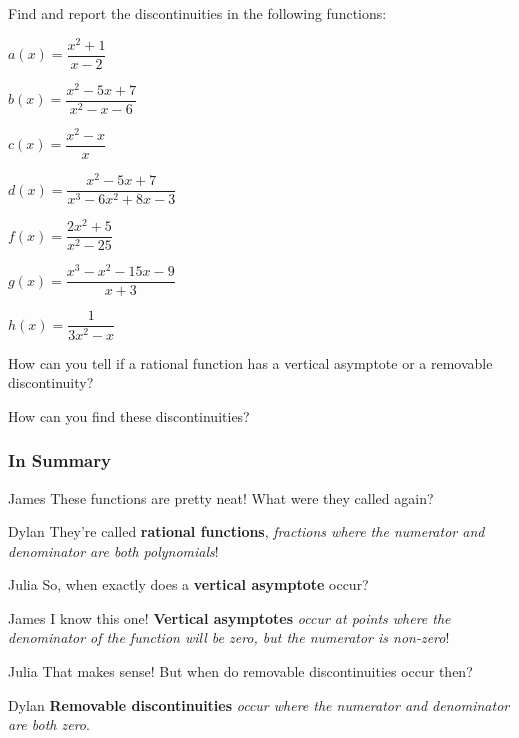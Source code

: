 \documentclass{ximera}
\begin{document}
Find and report the discontinuities in the following functions:

$a(x) = \dfrac{x^2+1}{x-2}$

$b(x) = \dfrac{x^2-5x+7}{x^2-x-6}$

$c(x) = \dfrac{x^2-x}{x}$

$d(x) = \dfrac{x^2-5x+7}{x^3-6x^2+8x-3}$

$f(x) = \dfrac{2x^2+5}{x^2-25}$

$g(x) = \dfrac{x^3-x^2-15x-9}{x+3}$

$h(x) = \dfrac{1}{3x^2-x}$

\begin{question}
How can you tell if a rational function has a vertical asymptote or a removable discontinuity?
\begin{freeResponse}
\end{freeResponse}
How can you find these discontinuities?
\begin{freeResponse}
\end{freeResponse}
\end{question}

\subsubsection{In Summary}
\begin{dialogue}
\item[James] These functions are pretty neat! What were they called again?
\item[Dylan] They're called \textbf{rational functions}, \textit{fractions where the numerator and denominator are both polynomials}!
\item[Julia] So, when exactly does a \textbf{vertical asymptote} occur?
\item[James] I know this one! \textbf{Vertical asymptotes} \textit{occur at points where the denominator of the function will be zero, but the numerator is non-zero}!
\item[Julia] That makes sense! But when do removable discontinuities occur then?
\item[Dylan] \textbf{Removable discontinuities} \textit{occur where the numerator and denominator are both zero}.
\end{dialogue}
\end{document}

